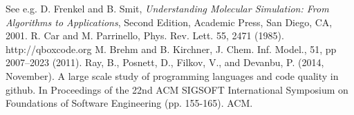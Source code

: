 \begin{thebibliography}{99}
See e.g. D. Frenkel and B. Smit, {\em Understanding Molecular Simulation:
From Algorithms to Applications}, Second Edition, Academic Press, San Diego, CA, 2001.
R. Car and M. Parrinello, Phys. Rev. Lett. 55, 2471 (1985).
 http://qboxcode.org
 M. Brehm and B. Kirchner, J. Chem. Inf. Model., 51, pp 2007–2023 (2011).
 Ray, B., Posnett, D., Filkov, V., and Devanbu, P. (2014, November). A large scale study of programming languages and code quality in github. In Proceedings of the 22nd ACM SIGSOFT International Symposium on Foundations of Software Engineering (pp. 155-165). ACM.
\end{thebibliography}
